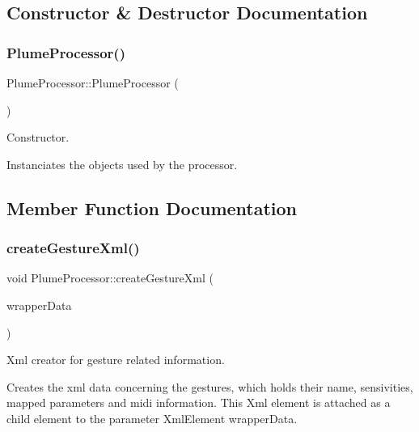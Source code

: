 \subsection{Constructor \& Destructor Documentation}
\mbox{\label{class_plume_processor_a1462b7f98f4677da0dab2d98dd8da1e1}} 
\subsubsection{\texorpdfstring{Plume\+Processor()}{PlumeProcessor()}}
{\footnotesize\ttfamily Plume\+Processor\+::\+Plume\+Processor (\begin{DoxyParamCaption}{ }\end{DoxyParamCaption})}



Constructor. 

Instanciates the objects used by the processor. 

\subsection{Member Function Documentation}
\mbox{\label{class_plume_processor_a14455799e2ddefd50b860d4492845509}} 
\subsubsection{\texorpdfstring{create\+Gesture\+Xml()}{createGestureXml()}}
{\footnotesize\ttfamily void Plume\+Processor\+::create\+Gesture\+Xml (\begin{DoxyParamCaption}\item[{Xml\+Element \&}]{wrapper\+Data }\end{DoxyParamCaption})}



Xml creator for gesture related information. 

Creates the xml data concerning the gestures, which holds their name, sensivities, mapped parameters and midi information. This Xml element is attached as a child element to the parameter Xml\+Element wrapper\+Data.


